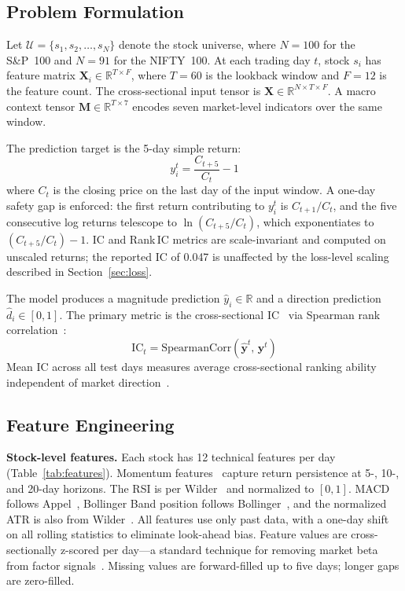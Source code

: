 \documentclass[journal]{IEEEtran}
\begin{document}
\subsection{Problem Formulation}

Let $\mathcal{U}=\{s_1,s_2,\dots,s_N\}$ denote the stock universe,
where $N=100$ for the S\&P~100 and $N=91$ for the NIFTY~100. At each
trading day $t$, stock $s_i$ has feature matrix
$\mathbf{X}_i\in\mathbb{R}^{T\times F}$, where $T=60$ is the lookback
window and $F=12$ is the feature count. The cross-sectional input
tensor is $\mathbf{X}\in\mathbb{R}^{N\times T\times F}$. A macro
context tensor $\mathbf{M}\in\mathbb{R}^{T\times 7}$ encodes seven
market-level indicators over the same window.

The prediction target is the 5-day simple return:
\begin{equation}
  y_i^t = \frac{C_{t+5}}{C_t} - 1
  \label{eq:target}
\end{equation}
where $C_t$ is the closing price on the last day of the input window.
A one-day safety gap is enforced: the first return contributing to
$y_i^t$ is $C_{t+1}/C_t$, and the five consecutive log returns
telescope to $\ln(C_{t+5}/C_t)$, which exponentiates to
$(C_{t+5}/C_t)-1$. IC and Rank\,IC metrics are scale-invariant and
computed on unscaled returns; the reported IC of 0.047 is unaffected
by the loss-level scaling described in Section~\ref{sec:loss}.

The model produces a magnitude prediction $\hat{y}_i\in\mathbb{R}$ and
a direction prediction $\hat{d}_i\in[0,1]$. The primary metric is the
cross-sectional IC~\cite{grinold2000active} via Spearman rank
correlation~\cite{spearman1904}:
\begin{equation}
  \mathrm{IC}_t = \mathrm{SpearmanCorr}\!\left(
                   \hat{\mathbf{y}}^t,\,\mathbf{y}^t\right)
  \label{eq:ic}
\end{equation}
Mean IC across all test days measures average cross-sectional ranking
ability independent of market direction~\cite{grinold2000active}.

\subsection{Feature Engineering}

\textbf{Stock-level features.} Each stock has 12 technical features per
day (Table~\ref{tab:features}). Momentum features~\cite{jegadeesh1993returns}
capture return persistence at 5-, 10-, and 20-day horizons. The RSI is
per Wilder~\cite{wilder1978rsi} and normalized to $[0,1]$. MACD follows
Appel~\cite{appel2005technical}, Bollinger Band position follows
Bollinger~\cite{bollinger2001bands}, and the normalized ATR is also
from Wilder~\cite{wilder1978rsi}. All features use only past data, with
a one-day shift on all rolling statistics to eliminate look-ahead bias.
Feature values are cross-sectionally z-scored per day---a standard
technique for removing market beta from factor
signals~\cite{kakushadze2020101}. Missing values are forward-filled up
to five days; longer gaps are zero-filled.
\end{document}
